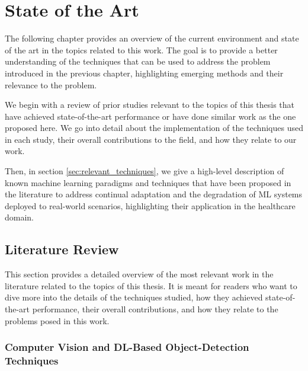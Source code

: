 \documentclass[../main.tex]{subfiles}
\begin{document}
    \chapter{State of the Art} \label{chap:state_of_the_art} 

    The following chapter provides an overview of the current environment and state of the art in the topics related to this work. The goal is to provide a better understanding of the techniques that can be used to address the problem introduced in the previous chapter, highlighting emerging methods and their relevance to the problem.
    
    We begin with a review of prior studies relevant to the topics of this thesis that have achieved state-of-the-art performance or have done similar work as the one proposed here. We go into detail about the implementation of the techniques used in each study, their overall contributions to the field, and how they relate to our work.
    
    Then, in section \ref{sec:relevant_techniques}, we give a high-level description of known machine learning paradigms and techniques that have been proposed in the literature to address continual adaptation and the degradation of ML systems deployed to real-world scenarios, highlighting their application in the healthcare domain.

    
    
    \section{Literature Review} \label{sec:literature_review} 

    This section provides a detailed overview of the most relevant work in the literature related to the topics of this thesis. It is meant for readers who want to dive more into the details of the techniques studied, how they achieved state-of-the-art performance, their overall contributions, and how they relate to the problems posed in this work.

    \subsection{Computer Vision and DL-Based Object-Detection Techniques } \label{sec:computer_vision_sota}
\end{document}
